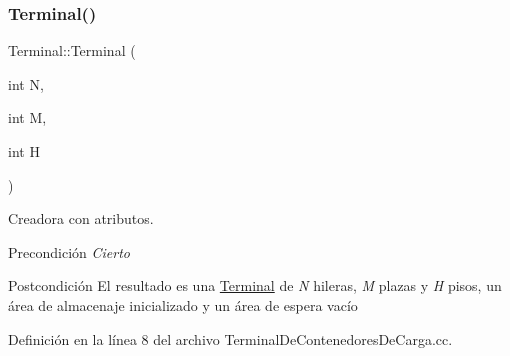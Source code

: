\subsubsection{\texorpdfstring{Terminal()}{Terminal()}}
{\footnotesize\ttfamily Terminal\+::\+Terminal (\begin{DoxyParamCaption}\item[{int}]{N,  }\item[{int}]{M,  }\item[{int}]{H }\end{DoxyParamCaption})}



Creadora con atributos. 

\begin{DoxyPrecond}{Precondición}
{\itshape Cierto} 
\end{DoxyPrecond}
\begin{DoxyPostcond}{Postcondición}
El resultado es una \hyperlink{class_terminal}{Terminal} de {\itshape N} hileras, {\itshape M} plazas y {\itshape H} pisos, un área de almacenaje inicializado y un área de espera vacío 
\end{DoxyPostcond}


Definición en la línea 8 del archivo Terminal\+De\+Contenedores\+De\+Carga.\+cc.


